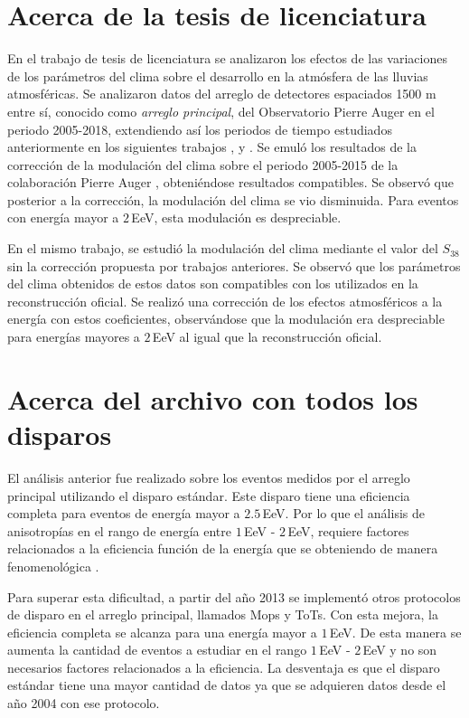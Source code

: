 
\section{Acerca de la tesis de licenciatura}

En el trabajo de tesis de licenciatura se analizaron los efectos de las variaciones de los parámetros del clima sobre el desarrollo en la atmósfera de las lluvias atmosféricas. Se analizaron datos del arreglo de detectores espaciados 1500 m entre sí, conocido como \emph{arreglo principal}, del Observatorio Pierre Auger en el periodo 2005-2018,  extendiendo  así los periodos de tiempo estudiados anteriormente en los siguientes trabajos \cite{abraham2009atmospheric}, \cite{abreu2012description}   y \cite{aab2017impact} . Se emuló los resultados de la corrección de la modulación del clima sobre el periodo 2005-2015 de la colaboración Pierre Auger \cite{aab2017impact}, obteniéndose resultados compatibles. Se observó que posterior a la corrección, la modulación del clima se vio disminuida. Para eventos con energía mayor a $2\,$EeV, esta modulación es despreciable.

En el mismo trabajo, se estudió la modulación del clima mediante el valor del $S_{38}$ sin la corrección propuesta por trabajos anteriores. Se observó que los parámetros del clima obtenidos de estos datos son compatibles con los utilizados en la reconstrucción oficial. Se realizó una corrección de los efectos atmosféricos a la energía con estos coeficientes, observándose que la modulación era despreciable para energías mayores a $2\,$EeV al igual que la reconstrucción oficial. 

\section{Acerca del archivo con todos los disparos}

El análisis anterior fue realizado sobre los eventos medidos por el arreglo principal utilizando el disparo estándar. Este disparo tiene una eficiencia completa para eventos de energía mayor a $2.5\,$EeV. Por lo que el análisis de anisotropías en el rango de energía entre $1\,$EeV - $2\,$EeV, requiere factores relacionados a la eficiencia función de la energía que se obteniendo de manera fenomenológica \cite{taborda}.

Para superar esta dificultad,  a partir del año 2013 se implementó otros protocolos de disparo en el arreglo principal, llamados Mops y ToTs. Con esta mejora, la eficiencia completa se alcanza para una energía mayor a $1\,$EeV. De esta manera se aumenta la cantidad de eventos a estudiar en el rango $1\,$EeV - $2\,$EeV y no son necesarios factores relacionados a la eficiencia. La desventaja es que el disparo estándar tiene una mayor cantidad de datos ya que se adquieren datos  desde el año 2004 con ese protocolo.

